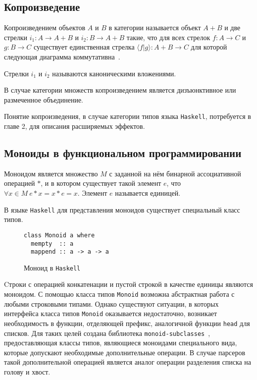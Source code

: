 \subsection{Копроизведение}

Копроизведением объектов $A$ и $B$ в категории называется объект $A + B$ и две
стрелки $i_1 : A \to A + B$ и $i_2 : B \to A + B$ такие, что для всех стрелок
$f : A \to C$ и $g : B \to C$ существует единственная стрелка 
$\langle f|g\rangle  : A + B \to C$ для которой следующая диаграмма 
коммутативна~\cite{TeorCat}.

\begin{center}
\end{center}

Стрелки $i_1$ и $i_2$ называются каноническими вложениями.

В случае категории множеств копроизведением является дизъюнктивное 
или размеченное объединение.  

Понятие копроизведения, в случае категории типов языка \lstinline{Haskell}, 
потребуется в главе 2, для описания расширяемых эффектов.

\subsection{Моноиды в функциональном программировании}

Моноидом является множество $M$ с заданной на нём бинарной ассоциативной 
операцией $*$, и в котором существует такой элемент 
$e$, что $\forall x \in M~e*x = x*e = x$. Элемент $e$ называется единицей.

В языке \lstinline{Haskell} для представления моноидов существует специальный 
класс типов.

\begin{figure}[h]
\begin{lstlisting}
class Monoid a where
  mempty  :: a
  mappend :: a -> a -> a
\end{lstlisting}
\caption{Моноид в \lstinline{Haskell}}
\label{listing:Monoid}
\end{figure}

Cтроки с операцией конкатенации и пустой строкой в качестве единицы являются 
моноидом. С помощью класса типов \lstinline{Monoid} возможна абстрактная работа 
с любыми строковыми типами. Однако существуют ситуации, в которых интерфейса 
класса типов \lstinline{Monoid} оказывается недостаточно, возникает 
необходимость в функции, отделяющей префикс, аналогичной функции 
\lstinline{head} для списков. Для таких целей создана библиотека 
\lstinline{monoid-subclasses}~\cite{monoids}, предоставляющая 
классы типов, являющиеся моноидами специального вида, которые допускают 
необходимые дополнительные операции. В случае парсеров такой дополнительной 
операцией является аналог операции разделения списка на голову и хвост.

